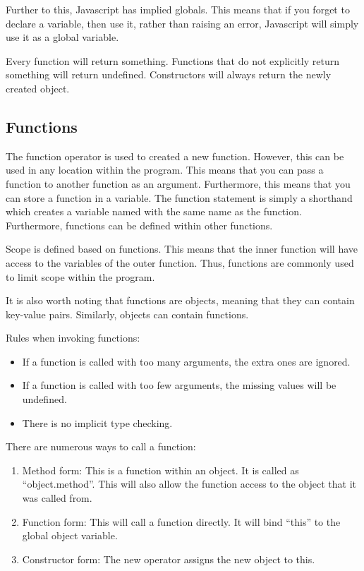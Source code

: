 \documentclass[a4paper,11pt]{report}
\begin{document}
			Further to this, Javascript has implied globals. 
			This means that if you forget to declare a variable, then use it, 
			rather than raising an error, Javascript will simply use it as a global variable. 

			Every function will return something. 
			Functions that do not explicitly return something will return undefined. 
			Constructors will always return the newly created object. 

		\subsection{Functions}
			The function operator is used to created a new function. 
			However, this can be used in any location within the program. 
			This means that you can pass a function to another function as an argument. 
			Furthermore, this means that you can store a function in a variable.
			The function statement is simply a shorthand which creates a variable named with the same name as the function. 
			Furthermore, functions can be defined within other functions. 

			Scope is defined based on functions. 
			This means that the inner function will have access to the variables of the outer function. 
			Thus, functions are commonly used to limit scope within the program. 

			It is also worth noting that functions are objects, meaning that they can contain key-value pairs. 
			Similarly, objects can contain functions. 

			Rules when invoking functions:
			\begin{itemize}
				\item If a function is called with too many arguments, the extra ones are ignored. 
				\item If a function is called with too few arguments, the missing values will be undefined. 
				\item There is no implicit type checking. 
			\end{itemize}
			
			There are numerous ways to call a function:
			\begin{enumerate}
				\item Method form: This is a function within an object. 
					It is called as ``object.method''. 
					This will also allow the function access to the object that it was called from. 
				\item Function form: This will call a function directly. 
					It will bind ``this'' to the global object variable. 
				\item Constructor form: The new operator assigns the new object to this. 
			\end{enumerate}
\end{document}
